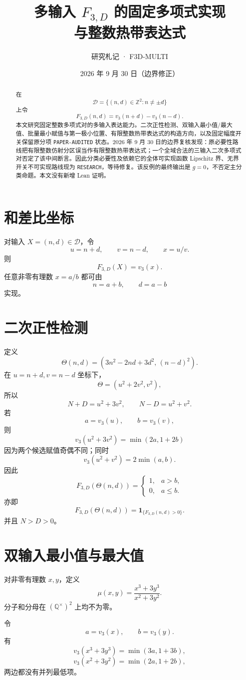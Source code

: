 \documentclass[11pt,a4paper]{ctexart}
\title{\bfseries 多输入 \(F_{3,D}\) 的固定多项式实现\\与整数热带表达式}
\author{研究札记 · F3D-MULTI}
\date{2026 年 9 月 30 日（边界修正）}
\newcommand{\F}{F_{3,D}}
\begin{document}
\maketitle

\begin{abstract}
在
\[
\mathcal D=\{(n,d)\in\mathbb Z^2:n\ne\pm d\}
\]
上令
\[
F_{3,D}(n,d)=v_3(n+d)-v_3(n-d).
\]
本文研究固定整数多项式对的多输入表达能力。二次正性检测、双输入最小值/最大值、批量最小赋值与第一极小位置、有限整数热带表达式的构造方向，以及固定幅度开关保留原分项 \texttt{PAPER-AUDITED} 状态。2026 年 9 月 30 日的边界复核发现：原必要性路线把有限整数仿射分区误当作有限整数热带表达式；一个全域合法的三输入二次多项式对否定了该中间断言。因此分类必要性及依赖它的全体可实现函数 Lipschitz 界、无界开关不可实现路线现为 \texttt{RESEARCH}，等待修复。该反例的最终输出是 \(g=0\)，不否定主分类命题。本文没有新增 Lean 证明。
\end{abstract}

\section{和差比坐标}
对输入 \(X=(n,d)\in\mathcal D\)，令
\[
u=n+d,\qquad v=n-d,\qquad x=u/v.
\]
则
\[
\boxed{\F(X)=v_3(x).}
\]
任意非零有理数 \(x=a/b\) 都可由
\[
n=a+b,\qquad d=a-b
\]
实现。

\section{二次正性检测}
定义
\[
\Theta(n,d)=
\left(
3n^2-2nd+3d^2,\,
(n-d)^2
\right).
\]
在 \(u=n+d,v=n-d\) 坐标下，
\[
\Theta=(u^2+2v^2,v^2),
\]
所以
\[
N+D=u^2+3v^2,\qquad N-D=u^2+v^2.
\]
若
\[
a=v_3(u),\qquad b=v_3(v),
\]
则
\[
v_3(u^2+3v^2)=\min(2a,1+2b)
\]
因为两个候选赋值奇偶不同；同时
\[
v_3(u^2+v^2)=2\min(a,b).
\]
因此
\[
\boxed{
\F(\Theta(n,d))
=
\begin{cases}
1,&a>b,\\
0,&a\le b.
\end{cases}
}
\]
亦即
\[
\boxed{
\F(\Theta(n,d))=\mathbf1_{\{\F(n,d)>0\}}.
}
\]
并且 \(N>D>0\)。

\section{双输入最小值与最大值}
对非零有理数 \(x,y\)，定义
\[
\mu(x,y)=
\frac{x^3+3y^3}{x^2+3y^2}.
\]
分子和分母在 \((\mathbb Q^\times)^2\) 上均不为零。

令
\[
a=v_3(x),\qquad b=v_3(y).
\]
有
\[
v_3(x^3+3y^3)=\min(3a,1+3b),
\]
\[
v_3(x^2+3y^2)=\min(2a,1+2b),
\]
两边都没有并列最低项。
\end{document}
